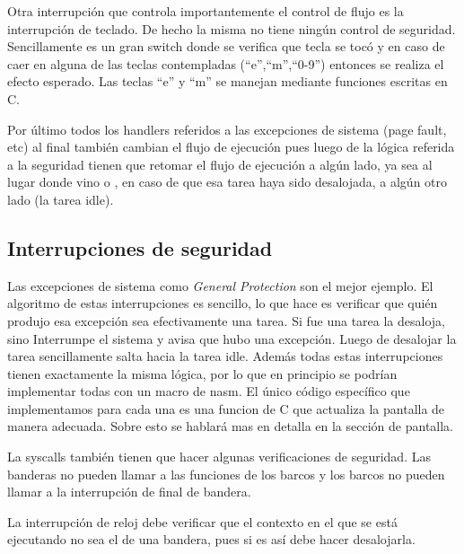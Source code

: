 	Otra interrupción que controla importantemente el control de
flujo es la interrupción de teclado. De hecho la misma no tiene
ningún control de seguridad. Sencillamente es un gran switch
donde se verifica que tecla se tocó y en caso de caer en alguna
de las teclas contempladas (``e'',``m'',``0-9'') entonces
se realiza el efecto esperado. Las teclas ``e'' y ``m'' se
manejan mediante funciones escritas en C.

	Por último todos los handlers referidos a las excepciones de
sistema (page fault, etc) al final también cambian el flujo de ejecución
pues luego de la lógica referida a la seguridad tienen que retomar
el flujo de ejecución a algún lado, ya sea al lugar donde vino o
, en caso de que esa tarea haya sido desalojada, a algún otro lado
(la tarea idle).

\subsection{Interrupciones de seguridad}

	Las excepciones de sistema como \textit{General Protection}
son el mejor ejemplo. El algoritmo de estas interrupciones es
sencillo, lo que hace es verificar que quién produjo
esa excepción sea efectivamente una tarea. Si fue una tarea la desaloja, 
sino Interrumpe el sistema y avisa que hubo una excepción. Luego
de desalojar la tarea sencillamente salta hacia la tarea idle. Además
todas estas interrupciones tienen exactamente la misma lógica, por lo
que en principio se podrían implementar todas con un macro de nasm.
El único código específico que implementamos para cada una es una funcion de C
que actualiza la pantalla de manera adecuada. Sobre esto se hablará
mas en detalla en la sección de pantalla.

	La syscalls también tienen que hacer algunas verificaciones de
seguridad. Las banderas no pueden llamar a las funciones de los barcos
y los barcos no pueden llamar a la interrupción de final de bandera.

	La interrupción de reloj debe verificar que el contexto en el
que se está ejecutando no sea el de una bandera, pues si es así
debe hacer desalojarla. 



